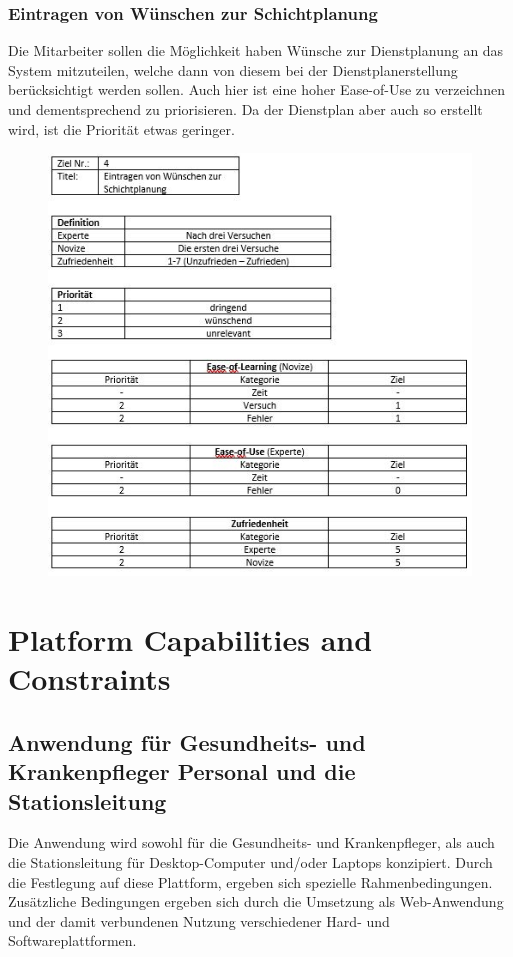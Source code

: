 \documentclass[11pt,
paper=a4,
bibtotocnumbered,	  %
liststotocnumbered,  %
DIV=calc,		  %
tablecaptionabove,	  %
headinclude,
]{article}
\begin{document}
\subsubsection{Eintragen von Wünschen zur Schichtplanung}
Die Mitarbeiter sollen die Möglichkeit haben Wünsche zur Dienstplanung an das System mitzuteilen, welche dann von diesem bei der Dienstplanerstellung berücksichtigt werden sollen. Auch hier ist eine hoher Ease-of-Use zu verzeichnen und dementsprechend zu priorisieren. Da der Dienstplan aber auch so erstellt wird, ist die Priorität etwas geringer.
\begin{figure}
\includegraphics[scale=1]{Bilder/wuensche.jpg}
\end{figure}
\section{Platform Capabilities and Constraints}
\subsection{Anwendung für Gesundheits- und Krankenpfleger Personal und die Stationsleitung}
Die Anwendung wird sowohl für die Gesundheits- und Krankenpfleger, als auch die Stationsleitung für Desktop-Computer und/oder Laptops konzipiert. Durch die Festlegung auf diese Plattform, ergeben sich spezielle Rahmenbedingungen. Zusätzliche Bedingungen ergeben sich durch die Umsetzung als Web-Anwendung und der damit verbundenen Nutzung verschiedener Hard- und Softwareplattformen.
\end{document}
